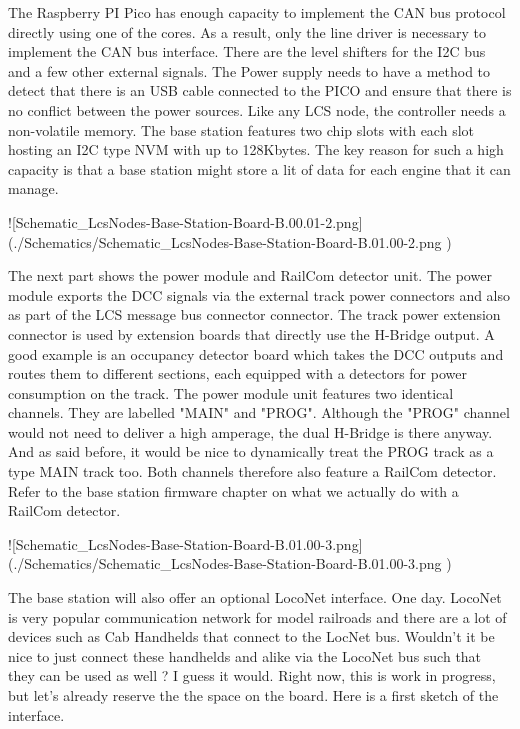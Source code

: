 The Raspberry PI Pico has enough capacity to implement the CAN bus protocol directly using one of the cores. As a result, only the line driver is necessary to implement the CAN bus interface. There are the level shifters for the I2C bus and a few other external signals. The Power supply needs to have a method to detect that there is an USB cable connected to the PICO and ensure that there is no conflict between the power sources. Like any LCS node, the controller needs a non-volatile memory. The base station features two chip slots with each slot hosting an I2C type NVM with up to 128Kbytes. The key reason for such a high capacity is that a base station might store a lit of data for each engine that it can manage.

![Schematic_LcsNodes-Base-Station-Board-B.00.01-2.png](./Schematics/Schematic_LcsNodes-Base-Station-Board-B.01.00-2.png )

The next part shows the power module and RailCom detector unit. The power module exports the DCC signals via the external track power connectors and also as part of the LCS message bus connector connector. The track power extension connector is used by extension boards that directly use the H-Bridge output. A good example is an occupancy detector board which takes the DCC outputs and routes them to different sections, each equipped with a detectors for power consumption on the track. The power module unit features two identical channels. They are labelled "MAIN" and "PROG". Although the "PROG" channel would not need to deliver a high amperage, the dual H-Bridge is there anyway. And as said before, it would be nice to dynamically treat the PROG track as a type MAIN track too. Both channels therefore also feature a RailCom detector. Refer to the base station firmware chapter on what we actually do with a RailCom detector.

![Schematic_LcsNodes-Base-Station-Board-B.01.00-3.png](./Schematics/Schematic_LcsNodes-Base-Station-Board-B.01.00-3.png )

The base station will also offer an optional LocoNet interface. One day. LocoNet is very popular communication network for model railroads and there are a lot of devices such as Cab Handhelds that connect to the LocNet bus. Wouldn't it be nice to just connect these handhelds and alike via the LocoNet bus such that they can be used as well ? I guess it would. Right now, this is work in progress, but let's already reserve the the space on the board. Here is a first sketch of the interface.

